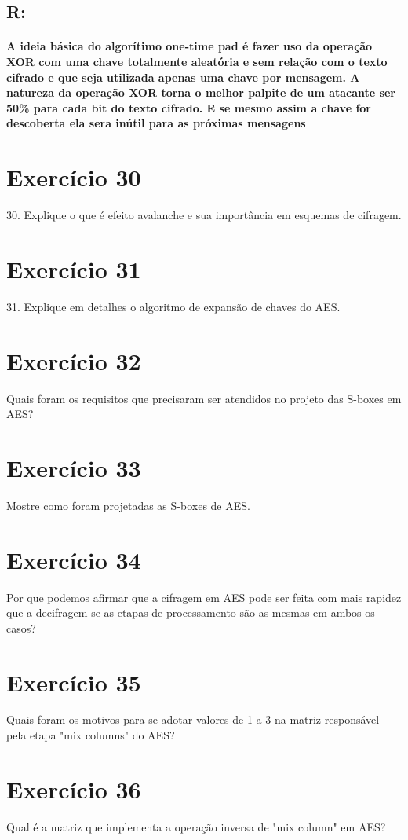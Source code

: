 \documentclass[10pt,a4paper]{article}
\begin{document}
\subsection*{R:}	
\paragraph*{A ideia básica do algorítimo one-time pad é fazer uso da operação XOR com uma chave totalmente aleatória e sem relação com o texto cifrado e que seja utilizada apenas uma chave por mensagem. A natureza da operação XOR torna o melhor palpite de um atacante ser 50\% para cada bit do texto cifrado. E se mesmo assim a chave for descoberta ela sera inútil para as próximas mensagens}
\section*{Exercício 30}
30. Explique o que é efeito avalanche e sua importância em esquemas de cifragem.\\
\section*{Exercício 31}
31. Explique em detalhes o algoritmo de expansão de chaves do AES.\\
\section*{Exercício 32}
Quais foram os requisitos que precisaram ser atendidos no projeto das S-boxes em AES?\\
\section*{Exercício 33}
Mostre como foram projetadas as S-boxes de AES.
\section*{Exercício 34}
Por que podemos afirmar que a cifragem em AES pode ser feita com mais rapidez que a decifragem se as etapas de processamento são as mesmas em ambos os casos?
\section*{Exercício 35}
Quais foram os motivos para se adotar valores de 1 a 3 na matriz responsável pela etapa "mix columns" do AES?
\section*{Exercício 36}
Qual é a matriz que implementa a operação inversa de "mix column" em AES?
\end{document}
